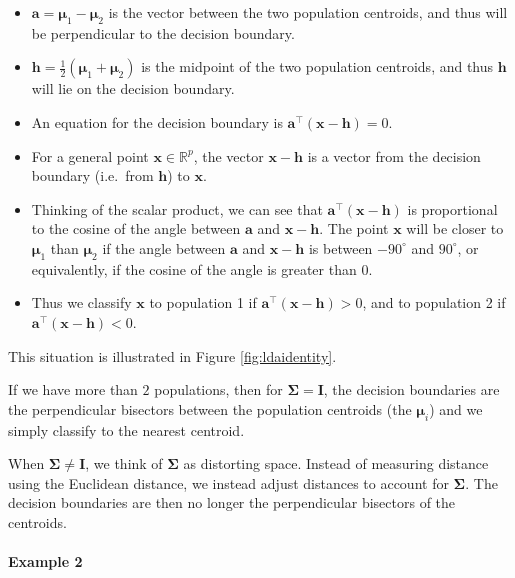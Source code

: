\documentclass[
]{book}
\theoremstyle{definition}
\theoremstyle{definition}
\theoremstyle{definition}
\theoremstyle{definition}
\theoremstyle{remark}
\begin{document}
\begin{itemize}
\item
  \(\mathbf a= {\boldsymbol{\mu}}_1-{\boldsymbol{\mu}}_2\) is the vector between the two population centroids, and thus will be perpendicular to the decision boundary.
\item
  \(\mathbf h= \frac{1}{2}({\boldsymbol{\mu}}_1+{\boldsymbol{\mu}}_2)\) is the midpoint of the two population centroids, and thus \(\mathbf h\) will lie on the decision boundary.
\item
  An equation for the decision boundary is \(\mathbf a^\top (\mathbf x- \mathbf h)=0\).
\item
  For a general point \(\mathbf x\in \mathbb{R}^p\), the vector \(\mathbf x-\mathbf h\) is a vector from the decision boundary (i.e.~from \(\mathbf h\)) to \(\mathbf x\).
\item
  Thinking of the scalar product, we can see that \(\mathbf a^\top (\mathbf x- \mathbf h)\) is proportional to the cosine of the angle between \(\mathbf a\) and \(\mathbf x-\mathbf h\). The point \(\mathbf x\) will be closer to \({\boldsymbol{\mu}}_1\) than \({\boldsymbol{\mu}}_2\) if the angle between \(\mathbf a\) and \(\mathbf x-\mathbf h\) is between \(-90^\circ\) and \(90^\circ\), or equivalently, if the cosine of the angle is greater than 0.
\item
  Thus we classify \(\mathbf x\) to population 1 if \(\mathbf a^\top (\mathbf x- \mathbf h)>0\), and to population 2 if \(\mathbf a^\top (\mathbf x- \mathbf h)<0\).
\end{itemize}

This situation is illustrated in Figure \ref{fig:ldaidentity}.

If we have more than \(2\) populations, then for \(\boldsymbol{\Sigma}=\mathbf I\), the decision boundaries are the perpendicular bisectors between the population centroids (the \({\boldsymbol{\mu}}_i\)) and we simply classify to the nearest centroid.

When \(\boldsymbol{\Sigma}\not =\mathbf I\), we think of \(\boldsymbol{\Sigma}\) as distorting space. Instead of measuring distance using the Euclidean distance, we instead adjust distances to account for \(\boldsymbol{\Sigma}\). The decision boundaries are then no longer the perpendicular bisectors of the centroids.

\paragraph*{Example 2}\label{example-2-1}
\end{document}
